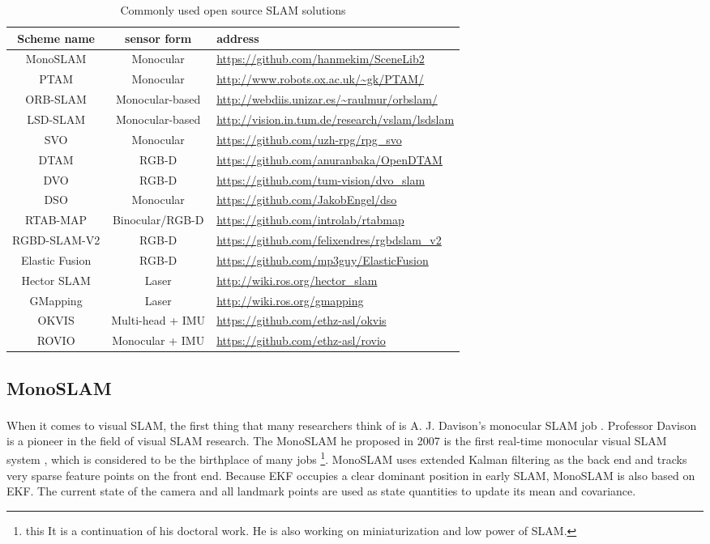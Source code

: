 {
\small
\begin{table}[! h]
\caption{Commonly used open source SLAM solutions}
\label{table: opensource-slam}
\begin{tabu}{@{} c | c | X @{}}
\toprule
Scheme name & sensor form & address \\
\midrule
MonoSLAM & Monocular & \url{https://github.com/hanmekim/SceneLib2} \\
PTAM & Monocular & \url{http://www.robots.ox.ac.uk/~gk/PTAM/} \\
ORB-SLAM & Monocular-based & \url{http://webdiis.unizar.es/~raulmur/orbslam/} \\
LSD-SLAM & Monocular-based & \url{http://vision.in.tum.de/research/vslam/lsdslam} \smallskip \\
SVO & Monocular & \url{https://github.com/uzh-rpg/rpg_svo} \\
DTAM & RGB-D & \url{https://github.com/anuranbaka/OpenDTAM} \\
DVO & RGB-D & \url{https://github.com/tum-vision/dvo_slam} \\
DSO & Monocular & \url{https://github.com/JakobEngel/dso} \\
RTAB-MAP & Binocular/RGB-D & \url{https://github.com/introlab/rtabmap} \\
RGBD-SLAM-V2 & RGB-D & \url{https://github.com/felixendres/rgbdslam_v2} \\
Elastic Fusion & RGB-D & \url{https://github.com/mp3guy/ElasticFusion} \\
Hector SLAM & Laser & \url{http://wiki.ros.org/hector_slam} \\
GMapping & Laser & \url{http://wiki.ros.org/gmapping} \\
OKVIS & Multi-head + IMU & \url{https://github.com/ethz-asl/okvis} \\
ROVIO & Monocular + IMU & \url{https://github.com/ethz-asl/rovio} \\
\bottomrule
\end{tabu}
\end{table}
}

\smallskip
\subsection{MonoSLAM}
When it comes to visual SLAM, the first thing that many researchers think of is A. J. Davison's monocular SLAM job \textsuperscript{\cite{Davison2007, Davison2003}}. Professor Davison is a pioneer in the field of visual SLAM research. The MonoSLAM he proposed in 2007 is the first real-time monocular visual SLAM system \textsuperscript{\cite{Davison2007}}, which is considered to be the birthplace of many jobs \footnote{this It is a continuation of his doctoral work. He is also working on miniaturization and low power of SLAM. }. MonoSLAM uses extended Kalman filtering as the back end and tracks very sparse feature points on the front end. Because EKF occupies a clear dominant position in early SLAM, MonoSLAM is also based on EKF. The current state of the camera and all landmark points are used as state quantities to update its mean and covariance.

